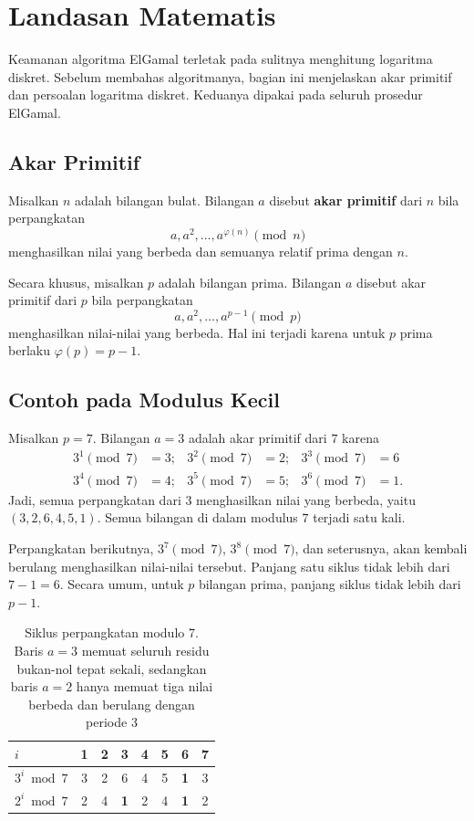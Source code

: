 \section{Landasan Matematis}
\label{sec:landasan-elgamal}

Keamanan algoritma ElGamal terletak pada sulitnya menghitung logaritma diskret.
Sebelum membahas algoritmanya, bagian ini menjelaskan akar primitif dan
persoalan logaritma diskret. Keduanya dipakai pada seluruh prosedur ElGamal.

\subsection{Akar Primitif}

Misalkan $n$ adalah bilangan bulat. Bilangan $a$ disebut \textbf{akar primitif}
dari $n$ bila perpangkatan
\[ a, a^{2}, \dots, a^{\varphi(n)} \pmod{n} \]
menghasilkan nilai yang berbeda dan semuanya relatif prima dengan $n$.

Secara khusus, misalkan $p$ adalah bilangan prima. Bilangan $a$ disebut akar
primitif dari $p$ bila perpangkatan
\[ a, a^{2}, \dots, a^{p-1} \pmod{p} \]
menghasilkan nilai-nilai yang berbeda. Hal ini terjadi karena untuk $p$ prima
berlaku $\varphi(p) = p - 1$.

\subsection{Contoh pada Modulus Kecil}

Misalkan $p = 7$. Bilangan $a = 3$ adalah akar primitif dari $7$ karena
\[
\begin{aligned}
3^{1} \pmod 7 &= 3; & 3^{2} \pmod 7 &= 2; & 3^{3} \pmod 7 &= 6 \\
3^{4} \pmod 7 &= 4; & 3^{5} \pmod 7 &= 5; & 3^{6} \pmod 7 &= 1 .
\end{aligned}
\]
Jadi, semua perpangkatan dari $3$ menghasilkan nilai yang berbeda, yaitu
$(3, 2, 6, 4, 5, 1)$. Semua bilangan di dalam modulus $7$ terjadi satu kali.

Perpangkatan berikutnya, $3^{7} \pmod 7$, $3^{8} \pmod 7$, dan seterusnya, akan
kembali berulang menghasilkan nilai-nilai tersebut. Panjang satu siklus tidak
lebih dari $7 - 1 = 6$. Secara umum, untuk $p$ bilangan prima, panjang siklus
tidak lebih dari $p - 1$.

\begin{table}[htbp]
    \centering
    \begin{tabular}{@{}l c c c c c c c@{}}
    \toprule
    $i$ & 1 & 2 & 3 & 4 & 5 & 6 & 7 \\
    \midrule
    $3^{i} \bmod 7$ & 3 & 2 & 6 & 4 & 5 & \textbf{1} & 3 \\
    $2^{i} \bmod 7$ & 2 & 4 & \textbf{1} & 2 & 4 & \textbf{1} & 2 \\
    \bottomrule
    \end{tabular}
    \caption{Siklus perpangkatan modulo 7. Baris $a = 3$ memuat seluruh residu
    bukan-nol tepat sekali, sedangkan baris $a = 2$ hanya memuat tiga nilai
    berbeda dan berulang dengan periode 3}
    \label{tab:akar-primitif-7}
\end{table}

